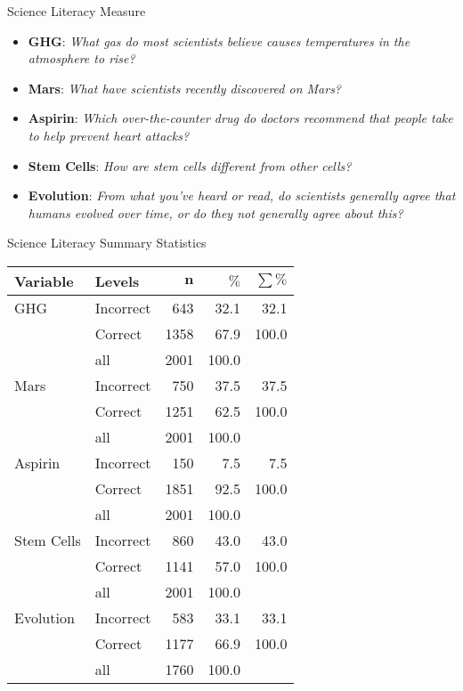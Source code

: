 \documentclass{beamer}
\begin{document}
\begin{frame}{Science Literacy Measure}

\begin{itemize}
\item \textbf{GHG}: \textit{What gas do most scientists believe causes
    temperatures in the atmosphere to rise?}

\item \textbf{Mars}: \textit{What have scientists recently discovered
    on Mars?}

\item \textbf{Aspirin}: \textit{Which over-the-counter drug do doctors
    recommend that people take to help prevent heart attacks?}

\item \textbf{Stem Cells}: \textit{How are stem cells different from
    other cells?}

\item \textbf{Evolution}: \textit{From what you’ve heard or read, do
    scientists generally agree that humans evolved over time, or do
    they not generally agree about this?}

\end{itemize}
  
\end{frame}

\begin{frame}{Science Literacy Summary Statistics}
\begin{center}
{
\begin{tabular}{llrrr}
 \textbf{Variable} & \textbf{Levels} & $\mathbf{n}$ & $\mathbf{\%}$ & $\mathbf{\sum \%}$ \\ 
  \hline
GHG & Incorrect & 643 & 32.1 & 32.1 \\ 
   & Correct & 1358 & 67.9 & 100.0 \\ 
   \hline
 & all & 2001 & 100.0 &  \\ 
   \hline
\hline
Mars & Incorrect & 750 & 37.5 & 37.5 \\ 
   & Correct & 1251 & 62.5 & 100.0 \\ 
   \hline
 & all & 2001 & 100.0 &  \\ 
   \hline
\hline
Aspirin & Incorrect & 150 & 7.5 & 7.5 \\ 
   & Correct & 1851 & 92.5 & 100.0 \\ 
   \hline
 & all & 2001 & 100.0 &  \\ 
   \hline
\hline
Stem Cells & Incorrect & 860 & 43.0 & 43.0 \\ 
   & Correct & 1141 & 57.0 & 100.0 \\ 
   \hline
 & all & 2001 & 100.0 &  \\ 
   \hline
\hline
Evolution & Incorrect & 583 & 33.1 & 33.1 \\ 
   & Correct & 1177 & 66.9 & 100.0 \\ 
   \hline
 & all & 1760 & 100.0 &  \\ 
   \hline
\hline
\end{tabular}
}
\end{center}
  
\end{frame}
\end{document}
